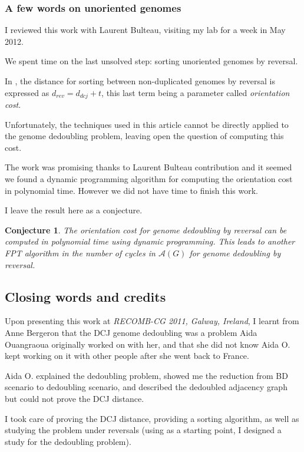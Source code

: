 \documentclass[11pt,final,twoside,nofrench]{thlifl}
\newtheorem{conjecture}{Conjecture}
\begin{document}
\subsubsection{A few words on unoriented genomes}
\label{unoriented}

I reviewed this work with Laurent Bulteau, visiting my lab for a week in May 2012. 

We spent time on the last unsolved step: sorting unoriented genomes by reversal.

In \cite{BMS-04}, the distance for sorting between non-duplicated genomes by reversal is expressed as $d_{rev} = d_{dcj} + t$, this last term being a parameter called \emph{orientation cost}.

Unfortunately, the techniques used in this article cannot be directly applied to the genome dedoubling problem, leaving open the question of computing this cost.

The work was promising thanks to Laurent Bulteau contribution and it seemed we found a dynamic programming algorithm for computing the orientation cost in polynomial time.
However we did not have time to finish this work.

I leave the result here as a conjecture. 

\begin{conjecture}
The orientation cost for genome dedoubling by reversal can be computed in polynomial time using dynamic programming. This leads to another FPT algorithm in the number of cycles in $\mathcal{A}(G)$ for genome dedoubling by reversal.
\end{conjecture}

\subsection{Closing words and credits}

Upon presenting this work at \emph{RECOMB-CG 2011, Galway, Ireland}, I learnt from Anne Bergeron that the DCJ genome dedoubling was a problem Aida Ouangraoua originally worked on with her, and that she did not know Aida O. kept working on it with other people after she went back to France.

Aida O. explained the dedoubling problem, showed me the reduction from BD scenario to dedoubling scenario, and described the dedoubled adjacency graph but could not prove the DCJ distance.

I took care of proving the DCJ distance, providing a sorting algorithm, as well as studying the problem under reversals (using \cite{BMS-04} as a starting point, I designed a study for the dedoubling problem).
\end{document}
